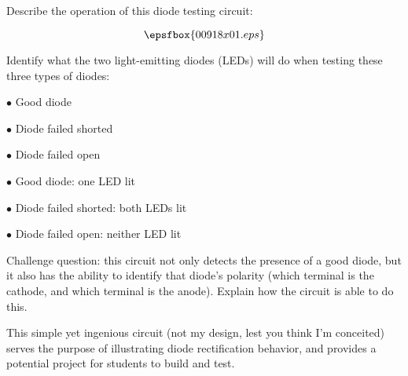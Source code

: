 

Describe the operation of this diode testing circuit:

$$\epsfbox{00918x01.eps}$$

Identify what the two light-emitting diodes (LEDs) will do when testing these three types of diodes:

\medskip
\item{$\bullet$} Good diode
\item{$\bullet$} Diode failed shorted
\item{$\bullet$} Diode failed open
\medskip







\medskip
\item{$\bullet$} Good diode: one LED lit
\item{$\bullet$} Diode failed shorted: both LEDs lit
\item{$\bullet$} Diode failed open: neither LED lit
\medskip

\vskip 10pt

Challenge question: this circuit not only detects the presence of a good diode, but it also has the ability to identify that diode's polarity (which terminal is the cathode, and which terminal is the anode).  Explain how the circuit is able to do this.







This simple yet ingenious circuit (not my design, lest you think I'm conceited) serves the purpose of illustrating diode rectification behavior, and provides a potential project for students to build and test.




